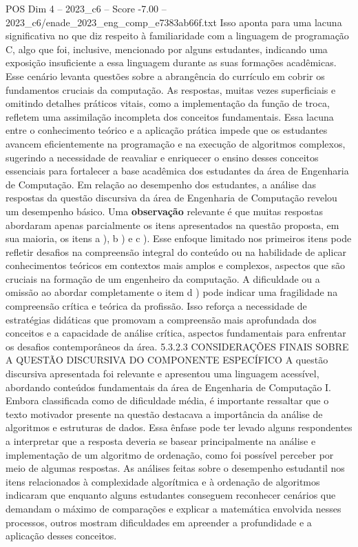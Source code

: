 \begin{textsample}{POS Dim 4 – 2023\_c6 – Score -7.00 – 2023\_c6/enade\_2023\_eng\_comp\_e7383ab66f.txt}
Isso aponta para uma lacuna significativa no que diz respeito à familiaridade com a linguagem de programação C, algo que foi, inclusive, mencionado por alguns estudantes, indicando uma exposição insuficiente a essa linguagem durante as suas formações acadêmicas.
Esse cenário levanta questões sobre a abrangência do currículo em cobrir os fundamentos cruciais da computação.
As respostas, muitas vezes superficiais e omitindo detalhes práticos vitais, como a implementação da função de troca, refletem uma assimilação incompleta dos conceitos fundamentais.
Essa lacuna entre o conhecimento teórico e a aplicação prática impede que os estudantes avancem eficientemente na programação e na execução de algoritmos complexos, sugerindo a necessidade de reavaliar e enriquecer o ensino desses conceitos essenciais para fortalecer a base acadêmica dos estudantes da área de Engenharia de Computação.
Em relação ao desempenho dos estudantes, a análise das respostas da questão discursiva da área de Engenharia de Computação revelou um desempenho básico.
Uma \textbf{observação} relevante é que muitas respostas abordaram apenas parcialmente os itens apresentados na questão proposta, em sua maioria, os itens a ), b ) e c ).
Esse enfoque limitado nos primeiros itens pode refletir desafios na compreensão integral do conteúdo ou na habilidade de aplicar conhecimentos teóricos em contextos mais amplos e complexos, aspectos que são cruciais na formação de um engenheiro da computação.
A dificuldade ou a omissão ao abordar completamente o item d ) pode indicar uma fragilidade na compreensão crítica e teórica da profissão.
Isso reforça a necessidade de estratégias didáticas que promovam a compreensão mais aprofundada dos conceitos e a capacidade de análise crítica, aspectos fundamentais para enfrentar os desafios contemporâneos da área. 5.3.2.3 CONSIDERAÇÕES FINAIS SOBRE A QUESTÃO DISCURSIVA DO COMPONENTE ESPECÍFICO A questão discursiva apresentada foi relevante e apresentou uma linguagem acessível, abordando conteúdos fundamentais da área de Engenharia de Computação I.
Embora classificada como de dificuldade média, é importante ressaltar que o texto motivador presente na questão destacava a importância da análise de algoritmos e estruturas de dados.
Essa ênfase pode ter levado alguns respondentes a interpretar que a resposta deveria se basear principalmente na análise e implementação de um algoritmo de ordenação, como foi possível perceber por meio de algumas respostas.
As análises feitas sobre o desempenho estudantil nos itens relacionados à complexidade algorítmica e à ordenação de algoritmos indicaram que enquanto alguns estudantes conseguem reconhecer cenários que demandam o máximo de comparações e explicar a matemática envolvida nesses processos, outros mostram dificuldades em apreender a profundidade e a aplicação desses conceitos.

\end{textsample}
